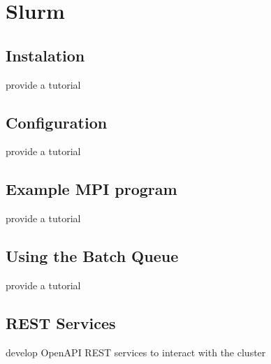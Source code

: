 \chapter{Slurm}

\section{Instalation}

\begin{exercise}
provide a tutorial 
\end{exercise}

\section{Configuration}

\begin{exercise}
provide a tutorial 
\end{exercise}

\section{Example MPI program}

\begin{exercise}
provide a tutorial 
\end{exercise}

\section{Using the Batch Queue}

\begin{exercise}
provide a tutorial 
\end{exercise}

\section{REST Services}

\begin{exercise}
develop OpenAPI REST services to interact with the cluster
\end{exercise}




